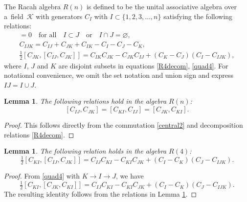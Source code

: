 \documentclass[pdftex]{sigma}
\numberwithin{equation}{section}
\newtheorem{Lemma}[Theorem]{Lemma}
\begin{document}
\begin{Definition}
The Racah algebra $R(n)$ is defined to be the unital associative algebra over a~field~$\mathcal{K}$ with generators $C_{I}$ with $I \subset \{ 1,2,3, \dots, {n}\}$ satisfying the following relations:
\begin{gather}
[C_{I},C_{J}] = 0\quad \mbox{for all}\quad I \subset J\quad \mbox{or}\quad I \cap J = \varnothing, \label{central2}\\
C_{IJK}=C_{IJ}+C_{JK}+C_{IK}-C_I -C_J-C_K, \label{R4decom}\\
\tfrac12 [C_{JK},[C_{IJ}, C_{JK}]]= C_{IK}C_{JK}-C_{JK}C_{IJ}+(C_K-C_J)(C_I-C_{IJK}) \label{quad4},
\end{gather}
where $I$, $J$ and $K$ are disjoint subsets in equations \eqref{R4decom}, \eqref{quad4}. For notational convenience, we omit the set notation and union sign and express $IJ=I \cup J$.
\end{Definition}
\begin{Lemma} \label{permutationsymofDs}
The following relations hold in the algebra $R(n)$:
\[
[C_{IJ}, C_{JK}]=[C_{KI}, C_{IJ}] =[C_{JK}, C_{KI}].
\]
\end{Lemma}
\begin{proof}
 This follows directly from the commutation \eqref{central2} and decomposition relations \eqref{R4decom}.
 \end{proof}
\begin{Lemma} The following relation holds in the algebra $R(4)$:
\begin{equation}
\tfrac12 [C_{KI},[C_{IJ}, C_{JK}]]= C_{IJ}C_{KI}-C_{KI}C_{JK}+(C_I-C_K)(C_J-C_{IJK}). \label{quad4b}
\end{equation}
\end{Lemma}
\begin{proof}
 From \eqref{quad4} with $K\rightarrow I \rightarrow J$, we have
\[\tfrac12 [C_{KI},[C_{JK}, C_{KI}]]= C_{IJ}C_{KI}-C_{KI}C_{JK}+(C_I-C_K)(C_J-C_{IJK}).\]
The resulting identity follows from the relations in Lemma \ref{permutationsymofDs}.
\end{proof}
\end{document}
